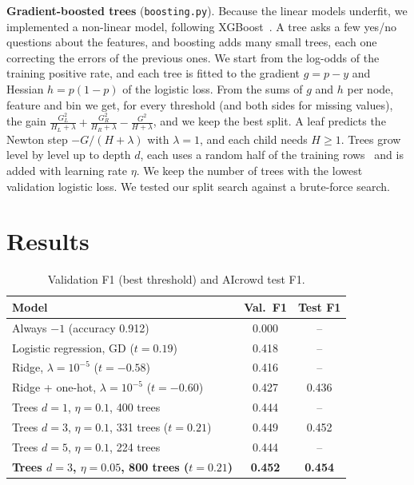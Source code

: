 \documentclass[10pt,conference,compsocconf]{IEEEtran}
\begin{document}
\textbf{Gradient-boosted trees} (\texttt{boosting.py}). Because the linear
models underfit, we implemented a non-linear model, following
XGBoost~\cite{xgboost,friedman}. A tree asks a few yes/no questions about the
features, and boosting adds many small trees, each one correcting the errors
of the previous ones. We start from the log-odds of the training positive
rate, and each tree is fitted to the gradient $g=p-y$ and Hessian $h=p(1-p)$
of the logistic loss. From the sums of $g$ and $h$ per node, feature and bin
we get, for every threshold (and both sides for missing values), the gain
$\frac{G_L^2}{H_L+\lambda}+\frac{G_R^2}{H_R+\lambda}-\frac{G^2}{H+\lambda}$,
and we keep the best split. A leaf predicts the Newton step $-G/(H+\lambda)$
with $\lambda=1$, and each child needs $H\ge1$. Trees grow level by level up
to depth $d$, each uses a random half of the training rows~\cite{stochastic}
and is added with learning rate $\eta$. We keep the number of trees with the
lowest validation logistic loss. We tested our split search against a
brute-force search.

\section{Results}
\begin{table}[t]
\caption{Validation F1 (best threshold) and AIcrowd test F1.}
\label{tab:models}
\centering
\small
\setlength{\tabcolsep}{4pt}
\begin{tabular}{@{}lcc@{}}
\toprule
Model & Val.\ F1 & Test F1 \\
\midrule
Always $-1$ (accuracy 0.912) & 0.000 & -- \\
Logistic regression, GD ($t=0.19$) & 0.418 & -- \\
Ridge, $\lambda=10^{-5}$ ($t=-0.58$) & 0.416 & -- \\
Ridge + one-hot, $\lambda=10^{-5}$ ($t=-0.60$) & 0.427 & 0.436 \\
Trees $d=1$, $\eta=0.1$, 400 trees & 0.444 & -- \\
Trees $d=3$, $\eta=0.1$, 331 trees ($t=0.21$) & 0.449 & 0.452 \\
Trees $d=5$, $\eta=0.1$, 224 trees & 0.444 & -- \\
\textbf{Trees $d=3$, $\eta=0.05$, 800 trees ($t=0.21$)} & \textbf{0.452} & \textbf{0.454} \\
\bottomrule
\end{tabular}
\end{table}
\end{document}
